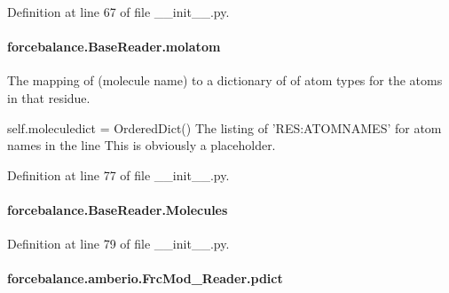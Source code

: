 Definition at line 67 of file \-\_\-\-\_\-init\-\_\-\-\_\-.\-py.

\hypertarget{classforcebalance_1_1BaseReader_ab444c213e15929253dd73395ac5f19fc}{
\paragraph[{molatom}]{\setlength{\rightskip}{0pt plus 5cm}forcebalance.\-Base\-Reader.\-molatom\hspace{0.3cm}{\ttfamily [inherited]}}}\label{classforcebalance_1_1BaseReader_ab444c213e15929253dd73395ac5f19fc}


The mapping of (molecule name) to a dictionary of of atom types for the atoms in that residue. 

self.\-moleculedict = Ordered\-Dict() The listing of 'R\-E\-S\-:A\-T\-O\-M\-N\-A\-M\-E\-S' for atom names in the line This is obviously a placeholder. 

Definition at line 77 of file \-\_\-\-\_\-init\-\_\-\-\_\-.\-py.

\hypertarget{classforcebalance_1_1BaseReader_a4369b5fb663a83b11602daa71db6862e}{
\paragraph[{Molecules}]{\setlength{\rightskip}{0pt plus 5cm}forcebalance.\-Base\-Reader.\-Molecules\hspace{0.3cm}{\ttfamily [inherited]}}}\label{classforcebalance_1_1BaseReader_a4369b5fb663a83b11602daa71db6862e}


Definition at line 79 of file \-\_\-\-\_\-init\-\_\-\-\_\-.\-py.

\hypertarget{classforcebalance_1_1amberio_1_1FrcMod__Reader_a2d62765145dd710032844ac8d7ec8a34}{
\paragraph[{pdict}]{\setlength{\rightskip}{0pt plus 5cm}forcebalance.\-amberio.\-Frc\-Mod\-\_\-\-Reader.\-pdict}}\label{classforcebalance_1_1amberio_1_1FrcMod__Reader_a2d62765145dd710032844ac8d7ec8a34}


